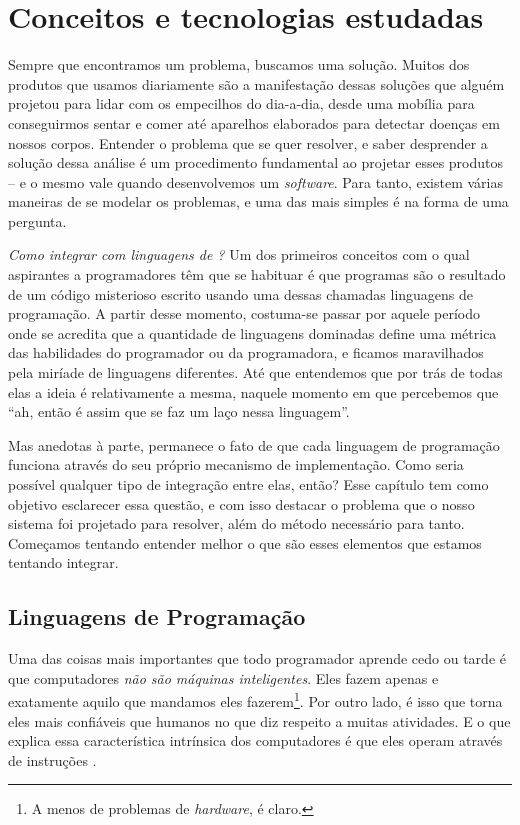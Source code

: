 
\chapter{Conceitos e tecnologias estudadas}
\label{cap:conceitos}
  Sempre que encontramos um problema, buscamos uma solução. Muitos dos produtos
  que usamos diariamente são a manifestação dessas soluções que alguém projetou
  para lidar com os empecilhos do dia-a-dia, desde uma mobília para conseguirmos
  sentar e comer até aparelhos elaborados para detectar doenças em nossos
  corpos. Entender o problema que se quer resolver, e saber desprender a solução
  dessa análise é um procedimento fundamental ao projetar esses produtos -- e o
  mesmo vale quando desenvolvemos um \textit{software}. Para tanto, existem
  várias maneiras de se modelar os problemas, e uma das mais simples é na forma
  de uma pergunta.

  \emph{Como integrar \CXX{} com linguagens de \script{}?} Um dos primeiros
  conceitos com o qual aspirantes a programadores têm que se habituar é que
  programas são o resultado de um código misterioso escrito usando uma dessas
  chamadas linguagens de programação. A partir desse momento, costuma-se passar
  por aquele período onde se acredita que a quantidade de linguagens dominadas
  define uma métrica das habilidades do programador ou da programadora, e
  ficamos maravilhados pela miríade de linguagens diferentes. Até que entendemos
  que por trás de todas elas a ideia é relativamente a mesma, naquele momento em
  que percebemos que ``ah, então é assim que se faz um laço nessa linguagem''.
  
  Mas anedotas à parte, permanece o fato de que cada linguagem de programação
  funciona através do seu próprio mecanismo de implementação. Como seria
  possível qualquer tipo de integração entre elas, então? Esse capítulo tem
  como objetivo esclarecer essa questão, e com isso destacar o problema que
  o nosso sistema foi projetado para resolver, além do método necessário para
  tanto. Começamos tentando entender melhor o que são esses elementos que
  estamos tentando integrar.

  \section{Linguagens de Programação}
  \label{cap:conceitos:linguagens}
    Uma das coisas mais importantes que todo programador aprende cedo ou tarde é
    que computadores \emph{não são máquinas inteligentes}. Eles fazem apenas e
    exatamente aquilo que mandamos eles fazerem\footnote{A menos de problemas de
    \textit{hardware}, é claro.}. Por outro lado, é isso que torna eles mais
    confiáveis que humanos no que diz respeito a muitas atividades. E o que
    explica essa característica intrínsica dos computadores é que eles operam
    através de instruções \cite{cpp:00}.

